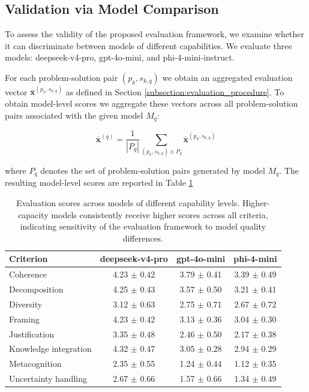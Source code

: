 \subsection{Validation via Model Comparison}

To assess the validity of the proposed evaluation framework, we examine whether it can discriminate between models of different capabilities. We evaluate three models: deepseek-v4-pro, gpt-4o-mini, and phi-4-mini-instruct.

For each problem-solution pair $(p_k,s_{k,q})$ we obtain an aggregated evaluation vector $\bar{\mathbf{x}}^{(p_k, s_{k,q})}$ as defined in Section \ref{subsection:evaluation_procedure}.
To obtain model-level scores we aggregate these vectors across all problem-solution pairs associated with the given model $M_q$:

\[
\bar{\mathbf{x}}^{(q)} = \frac{1}{|P_q|} \sum_{(p_k,s_{k,q}) \in P_q} \bar{\mathbf{x}}^{(p_k, s_{k,q})}
\]

where $P_q$ denotes the set of problem-solution pairs generated by model $M_q$. The resulting model-level scores are reported in Table \ref{table:model_comparison}

\begin{table}[h]
\centering
\small
\begin{tabular}{lccc}
\hline
\textbf{Criterion} & \textbf{deepseek-v4-pro} & \textbf{gpt-4o-mini} & \textbf{phi-4-mini} \\
\hline
Coherence & 4.23 $\pm$ 0.42 & 3.79 $\pm$ 0.41 & 3.39 $\pm$ 0.49 \\
Decomposition & 4.25 $\pm$ 0.43 & 3.57 $\pm$ 0.50 & 3.21 $\pm$ 0.41 \\
Diversity & 3.12 $\pm$ 0.63 & 2.75 $\pm$ 0.71 & 2.67 $\pm$ 0.72 \\
Framing & 4.23 $\pm$ 0.42 & 3.13 $\pm$ 0.36 & 3.04 $\pm$ 0.30 \\
Justification & 3.35 $\pm$ 0.48 & 2.46 $\pm$ 0.50 & 2.17 $\pm$ 0.38 \\
Knowledge integration & 4.32 $\pm$ 0.47 & 3.05 $\pm$ 0.28 & 2.94 $\pm$ 0.29 \\
Metacognition & 2.35 $\pm$ 0.55 & 1.24 $\pm$ 0.44 & 1.12 $\pm$ 0.35 \\
Uncertainty handling & 2.67 $\pm$ 0.66 & 1.57 $\pm$ 0.66 & 1.34 $\pm$ 0.49 \\
\hline
\end{tabular}
\caption{Evaluation scores across models of different capability levels. Higher-capacity models consistently receive higher scores across all criteria, indicating sensitivity of the evaluation framework to model quality differences.}
\label{table:model_comparison}
\end{table}

